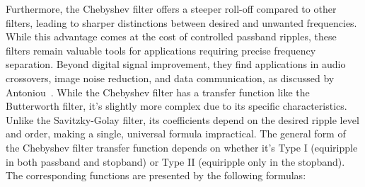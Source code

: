 Furthermore, the Chebyshev filter offers a steeper roll-off compared to other filters, leading to sharper distinctions between desired and unwanted frequencies.
While this advantage comes at the cost of controlled passband ripples, these filters remain valuable tools for applications requiring precise frequency separation.
Beyond digital signal improvement, they find applications in audio crossovers, image noise reduction, and data communication, as discussed by Antoniou~\cite{antoniouDigitalFiltersAnalysis2018}.
While the Chebyshev filter has a transfer function like the Butterworth filter, it's slightly more complex due to its specific characteristics.
Unlike the Savitzky-Golay filter, its coefficients depend on the desired ripple level and order, making a single, universal formula impractical.
The general form of the Chebyshev filter transfer function depends on whether it's Type I (equiripple in both passband and stopband) or Type II (equiripple only in the stopband).
The corresponding functions are presented by the following formulas:~

